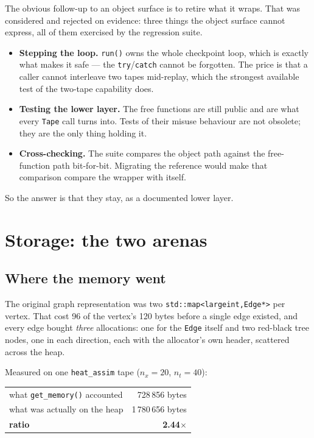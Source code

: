 \documentclass[11pt,a4paper]{report}
\newcommand{\code}[1]{\texttt{#1}}
\begin{document}
The obvious follow-up to an object surface is to retire what it wraps. That was
considered and rejected on evidence: three things the object surface cannot
express, all of them exercised by the regression suite.

\begin{itemize}
\item \textbf{Stepping the loop.} \code{run()} owns the whole checkpoint loop,
      which is exactly what makes it safe --- the \code{try}/\code{catch} cannot
      be forgotten. The price is that a caller cannot interleave two tapes
      mid-replay, which the strongest available test of the two-tape capability
      does.
\item \textbf{Testing the lower layer.} The free functions are still public and
      are what every \code{Tape} call turns into. Tests of their misuse
      behaviour are not obsolete; they are the only thing holding it.
\item \textbf{Cross-checking.} The suite compares the object path against the
      free-function path bit-for-bit. Migrating the reference would make that
      comparison compare the wrapper with itself.
\end{itemize}

So the answer is that they stay, as a documented lower layer.

\chapter{Storage: the two arenas}
\label{ch:arena}

\section{Where the memory went}

The original graph representation was two \code{std::map<largeint,Edge*>} per
vertex. That cost 96 of the vertex's 120 bytes before a single edge existed, and
every edge bought \emph{three} allocations: one for the \code{Edge} itself and
two red-black tree nodes, one in each direction, each with the allocator's own
header, scattered across the heap.

Measured on one \code{heat\_assim} tape ($n_x{=}20$, $n_t{=}40$):

\begin{center}
\begin{tabular}{@{}lr@{}}
\toprule
what \code{get\_memory()} accounted & 728\,856 bytes \\
what was actually on the heap       & 1\,780\,656 bytes \\
\textbf{ratio}                      & \textbf{2.44$\times$} \\
\bottomrule
\end{tabular}
\end{center}
\end{document}
